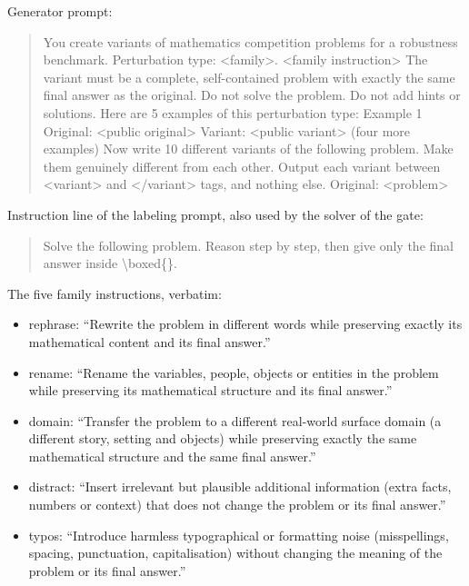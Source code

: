 {\footnotesize
Generator prompt:
\begin{quote}\ttfamily
You create variants of mathematics competition problems for a robustness benchmark. Perturbation type: <family>. <family instruction> The variant must be a complete, self-contained problem with exactly the same final answer as the original. Do not solve the problem. Do not add hints or solutions. Here are 5 examples of this perturbation type: Example 1 Original: <public original> Variant: <public variant> (four more examples) Now write 10 different variants of the following problem. Make them genuinely different from each other. Output each variant between <variant> and </variant> tags, and nothing else. Original: <problem>
\end{quote}
Instruction line of the labeling prompt, also used by the solver of the gate:
\begin{quote}\ttfamily
Solve the following problem. Reason step by step, then give only the final answer inside \textbackslash{}boxed\{\}.
\end{quote}
}
The five family instructions, verbatim:
\begin{itemize}
\item rephrase: ``Rewrite the problem in different words while preserving exactly its mathematical content and its final answer.''
\item rename: ``Rename the variables, people, objects or entities in the problem while preserving its mathematical structure and its final answer.''
\item domain: ``Transfer the problem to a different real-world surface domain (a different story, setting and objects) while preserving exactly the same mathematical structure and the same final answer.''
\item distract: ``Insert irrelevant but plausible additional information (extra facts, numbers or context) that does not change the problem or its final answer.''
\item typos: ``Introduce harmless typographical or formatting noise (misspellings, spacing, punctuation, capitalisation) without changing the meaning of the problem or its final answer.''
\end{itemize}


